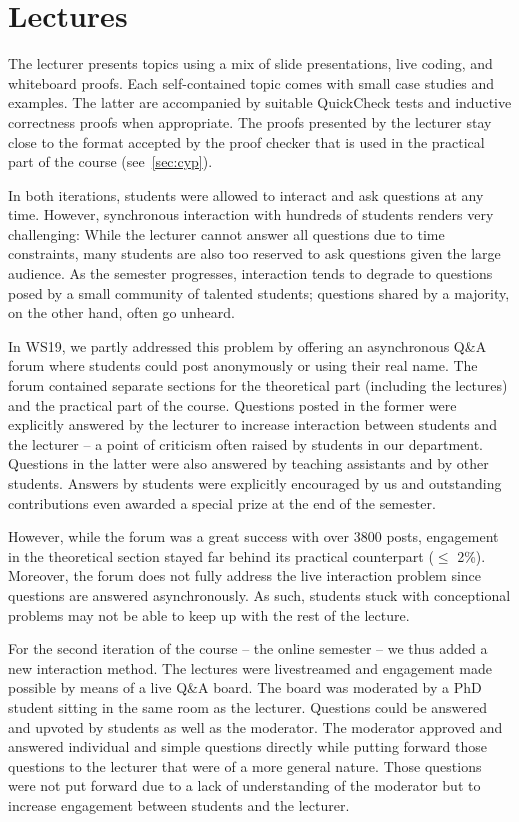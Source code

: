 \section{Lectures}\label{sec:lectures}

The lecturer presents topics using a mix of
slide presentations,
live coding, and whiteboard proofs.
Each self-contained topic comes with small case studies and examples.
The latter are accompanied by suitable QuickCheck tests
and inductive correctness proofs when appropriate.
The proofs presented by the lecturer stay close to the format accepted by the proof checker that is used in the practical part of the course (see~\cref{sec:cyp}).

In both iterations, students were allowed to interact and ask questions at any time.
However, synchronous interaction with hundreds of students renders very challenging:
While the lecturer cannot answer all questions due to time constraints,
many students are also too reserved to ask questions given the large audience.
As the semester progresses, interaction tends to degrade to
questions posed by a small community of talented students;
questions shared by a majority, on the other hand, often go unheard.

In WS19, we partly addressed this problem by offering an asynchronous Q\&A forum
where students could post anonymously or using their real name.
The forum contained separate sections for the theoretical part (including the lectures)
and the practical part of the course.
Questions posted in the former were explicitly answered by the lecturer
to increase interaction between students and the lecturer -- a point of criticism often raised by students in our department.
Questions in the latter were also answered by teaching assistants and by other students.
Answers by students were explicitly encouraged by us and
outstanding contributions even awarded a special prize at the end of the semester.

However, while the forum was a great success with over 3800 posts,
engagement in the theoretical section stayed far behind its practical counterpart ($\leq$ 2\%).
Moreover, the forum does not fully address the live interaction problem since
questions are answered asynchronously.
As such, students stuck with conceptional problems may not be able
to keep up with the rest of the lecture.

For the second iteration of the course -- the online semester --
we thus added a new interaction method.
The lectures were livestreamed and
engagement made possible by means of a live Q\&A board.
The board was moderated by a PhD student
sitting in the same room as the lecturer.
Questions could be answered and upvoted by students as well as the moderator.
The moderator approved and answered individual and simple questions directly while putting forward those questions to the lecturer that were of a more general nature.
Those questions were not put forward due to a lack of understanding of the moderator
but to increase engagement between students and the lecturer.

